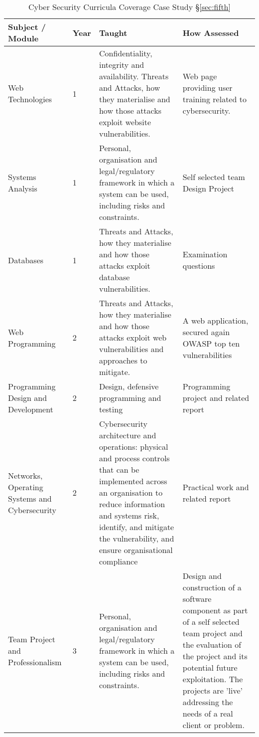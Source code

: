 \documentclass[conference]{IEEEtran}
\begin{document}
\begin{table*}[ht]
	\caption{Cyber Security Curricula Coverage Case Study \S\ref{sec:fifth}\label{tab:CaseStudy5}}{%
		\begin{tabular}{|p{3cm}|p{1cm}|p{6.5cm}|p{6.5cm}| }
			\hline
			Subject / Module & Year & Taught & How Assessed \\
			\hline
			Web Technologies & 1 & Confidentiality, integrity and availability. Threats and Attacks, how they materialise and how those attacks exploit website vulnerabilities. & Web page providing user training related to cybersecurity. \\
			\hline
			Systems Analysis & 1 & Personal, organisation and legal/regulatory framework in which a system can be used, including risks and constraints. & Self selected team Design Project \\
			\hline
			Databases & 1 & Threats and Attacks, how they materialise and how those attacks exploit database vulnerabilities. & Examination questions\\
			\hline
			Web Programming & 2 & Threats and Attacks, how they materialise and how those attacks exploit web vulnerabilities and approaches to mitigate. & A web application, secured again OWASP top ten vulnerabilities \\
			\hline
			Programming Design and Development & 2 & Design, defensive programming and testing & Programming project and related report\\
			\hline
			Networks, Operating Systems and Cybersecurity & 2 & Cybersecurity architecture and operations: physical and process controls that can be implemented across an organisation to reduce information and systems risk, identify, and mitigate the vulnerability, and ensure organisational compliance & Practical work and related report\\
			\hline
			Team Project and Professionalism & 3 & Personal, organisation and legal/regulatory framework in which a system can be used, including risks and constraints. & Design and construction of a software component as part of a self selected team project and the evaluation of the project and its potential future exploitation. The projects are 'live' addressing the needs of a real client or problem.\\%
\hline%
\end{tabular}%
	}
\end{table*}
\end{document}
